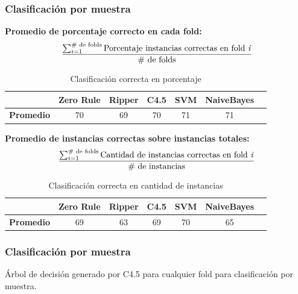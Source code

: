 \documentclass[mathserif]{beamer}%
\begin{document}
\begin{frame}[noframenumbering]
	\frametitle{Clasificación por muestra}
	
	\textbf{Promedio de porcentaje correcto en cada fold:}
	\[
	{ \sum_{i=1}^{\text{\# de folds}} \text{Porcentaje instancias correctas en fold \textit{i}}
	\over
	\text{\# de folds}
	}
	\]
	
{\small 	\begin{table}[H]
		\centering
		\begin{tabular}{|l|c|c|c|c|c|c|}
			\hline
			\textbf{}  & \textbf{Zero Rule} & \textbf{Ripper} & \textbf{C4.5} & \textbf{SVM} & \textbf{NaiveBayes} \\ \hline
			\textbf{Promedio} & 70  & 69 & 70 & 71 & 71 \\ \hline
		\end{tabular}
		\caption{Clasificación correcta en porcentaje}
		\label{HPTDT_clas_xval_porHab}
	\end{table}}
	
	\textbf{Promedio de instancias correctas sobre instancias totales:}
	\small
	\[
	{ \sum_{i=1}^{\text{\# de folds}} \text{Cantidad de instancias correctas en fold \textit{i}}
		\over
		\text{\# de instancias}
	}
	\]

{\small 	\begin{table}[H]
		\centering
		\begin{tabular}{|l|c|c|c|c|c|c|}
			\hline
			\textbf{}  & \textbf{Zero Rule} & \textbf{Ripper} & \textbf{C4.5} & \textbf{SVM} & \textbf{NaiveBayes} \\ \hline
			\textbf{Promedio} & 69  & 63 & 69 & 70 & 65 \\ \hline
		\end{tabular}
		\caption{Clasificación correcta en cantidad de instancias}
		\label{HPTDT_clas_xval_porHab}
	\end{table}}
	
\end{frame}

\begin{frame}[noframenumbering]
	\frametitle{Clasificación por muestra}
	
	Árbol de decisión generado por C4.5 para cualquier fold para clasificación por muestra.
	
	
\end{frame}
\end{document}

